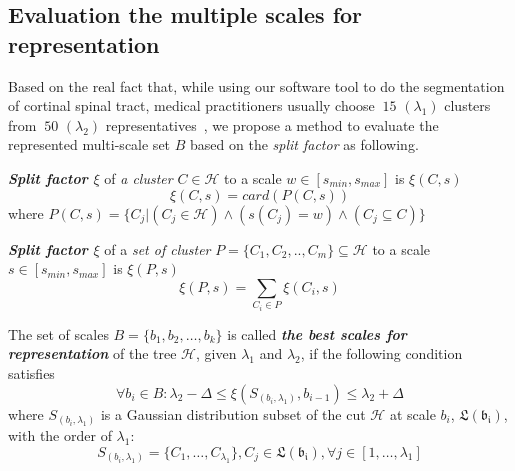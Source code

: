 \subsection{Evaluation the multiple scales for representation}
\label{subsec:evaluation_scales}
Based on the real fact that, while using our software tool to do the segmentation of cortinal spinal tract, medical practitioners usually choose $~15$ $(\lambda_1)$ clusters from $~50$ $(\lambda_2)$ representatives~\cite{prni2013-boi}, we propose a method to evaluate the represented multi-scale set $\mathsf{\textit{B}}$ based on the \textit{split factor} as following.

\begin{definition}
\label{def:split_factor} \textbf{\textit{Split factor $\xi$}} of \textit{a cluster} $C \in \mathcal{H}$ to a scale $w \in [s_{min},s_{max}]$ is $\xi(C,s)$
\begin{equation}
\xi(C,s) = card(P(C,s))
\end{equation}
where $P(C,s) = \{ C_j | (C_j \in \mathcal{H}) \wedge (s(C_j) = w) \wedge (C_j \subseteq C) \}$ 
\end{definition}
\begin{definition}
\label{def:split_factor_set} \textbf{\textit{Split factor $\xi$}} of a \textit{set of cluster} $P=\{C_1, C_2,.., C_m\} \subseteq \mathcal{H}$ to a scale $s \in [s_{min},s_{max}]$ is $\xi(P,s)$
\begin{equation}
\xi(P,s) = \sum_{C_i \in P}\xi(C_i,s)
\end{equation}
\end{definition}
\begin{definition}
\label{def:best_scales} The set of scales $\mathsf{\textit{B}} = \{b_1, b_2, \ldots, b_k\}$ is called \textbf{\textit{the best scales for representation}} of the tree $\mathcal{H}$, given $\lambda_1$ and $\lambda_2$, if the following condition satisfies
\begin{equation}
\label{equ:best_scale}
\forall b_i \in \mathsf{\textit{B}}: \lambda_2 - \Delta \leq \xi(S_{(b_i,\lambda_1)},b_{i-1}) \leq \lambda_2 + \Delta 
\end{equation}
where $S_{(b_i,\lambda_1)}$ is a Gaussian distribution subset of the cut $\mathcal{H}$ at scale $b_i$, $\mathfrak{L(b_i)}$, with the order of $\lambda_1$:
\begin{equation}
S_{(b_i,\lambda_1)} = \{C_1, \ldots, C_{\lambda_1}\}, C_j \in \mathfrak{L(b_i)}, \forall j \in [1, \ldots, \lambda_1] 
\end{equation}
\end{definition}
